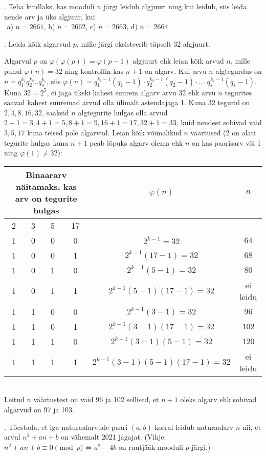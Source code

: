 \documentclass[a4paper, 10pt]{article}
\begin{document}
. Teha kindlaks, kas mooduli $n$ j\"argi leidub algjuuri ning 
kui leidub, siis leida nende arv ja \"uks algjuur, kui \\
{${}_{}$}\hskip1.5cm
 a) $n=2661$, \hskip0.5cm b) $n=2662$, \hskip0.5cm c) $n=2663$, \hskip0.5cm d) $n=2664$.

\bigskip

. Leida kõik algarvud $p$, mille järgi eksisteerib täpselt 32 algjuurt.

\bigskip
Algarvul $p$ on $\varphi(\varphi(p))=\varphi(p-1)$ algjuurt ehk leian kõik arvud $n$, mille puhul $\varphi(n)=32$ ning kontrollin kas $n+1$ on algarv. Kui arvu $n$ algtegurdus on $n=q_1^{k_1}q_2^{k_2}..q_s^{k_s}$, siis $\varphi(n)=q_1^{k_1-1}(q_1-1)\cdot q_2^{k_2-1}(q_2-1)\cdot ..\cdot q_s^{k_s-1}(q_s-1)$. Kuna $32=2^5$, ei jaga ükski kahest suurem algarv arvu 32 ehk arvu $n$ tegurites saavad kahest suuremad arvud olla ülimalt astendajaga 1. Kuna $32$ tegurid on $2,4,8,16,32$, saaksid $n$ algtegurite hulgas olla arvud $2+1=3, 4+1=5, 8+1=9, 16+1=17, 32+1=33$, kuid nendest sobivad vaid $3,5,17$ kuna teised pole algarvud. Leian kõik võimalikud $n$ väärtused (2 on alati tegurite hulgas kuna $n+1$ peab lõpuks algarv olema ehk $n$ on kas paarisarv või 1 ning $\varphi(1)\neq32$):\\
\begin{tabular}{cccc|c|c}
\multicolumn{4}{c|}{Binaararv näitamaks, kas arv on tegurite hulgas} & $\varphi(n)$ & $n$\\
\hline
2&3&5&17&\\
\hline
\hline
1&0&0&0&$2^{k-1}=32$&$64$\\
\hline
1&0&0&1&$2^{k-1}(17-1)=32$&$68$\\
\hline
1&0&1&0&$2^{k-1}(5-1)=32$&$80$\\
\hline
1&0&1&1&$2^{k-1}(5-1)(17-1)=32$&ei leidu\\
\hline
1&1&0&0&$2^{k-1}(3-1)=32$&$96$\\
\hline
1&1&0&1&$2^{k-1}(3-1)(17-1)=32$&$102$\\
\hline
1&1&1&0&$2^{k-1}(3-1)(5-1)=32$&$120$\\
\hline
1&1&1&1&$2^{k-1}(3-1)(5-1)(17-1)=32$&ei leidu\\
\end{tabular}\\
Leitud $n$ väärtustest on vaid 96 ja 102 sellised, et $n+1$ oleks algarv ehk sobivad algarvud on 97 ja 103.
\bigskip

. Tõestada, et iga naturaalarvude paari $(a,b)$ korral leidub naturaalarv $n$ nii, et arvul $n^2+an+b$ on vähemalt 2021 jagajat. (Vihje: $n^2+an+b \equiv 0\pmod{p}\Longleftrightarrow a^2-4b$ on ruutjääk mooduli $p$ järgi.)
\end{document}
